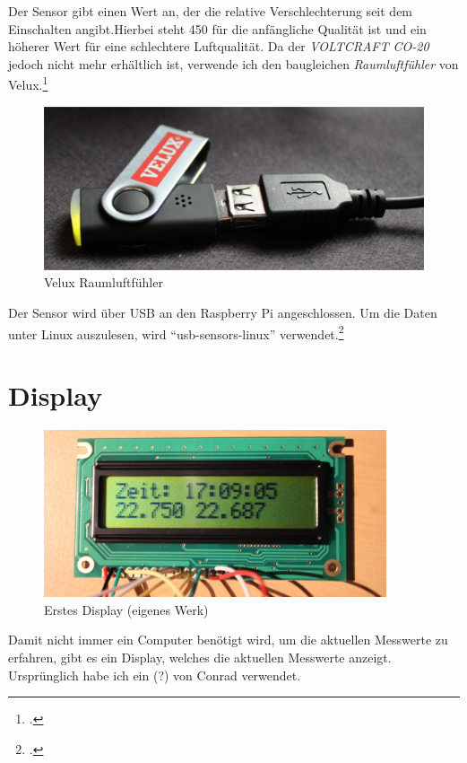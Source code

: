 Der Sensor gibt einen Wert an, der die relative Verschlechterung seit dem Einschalten angibt.Hierbei steht 450 für die anfängliche Qualität ist und ein höherer Wert für eine schlechtere Luftqualität.
Da der \textit{VOLTCRAFT CO-20} jedoch nicht mehr erhältlich ist, verwende ich den baugleichen \textit{Raumluftfühler} von Velux.\footcite{Velux}

\begin{figure}[h]
  \centering
     \includegraphics[width=\textwidth]{figures/velux.jpg}
  \caption{Velux Raumluftfühler}
  \label{fig:velux}
\end{figure}

Der Sensor wird über USB an den Raspberry Pi angeschlossen. Um die Daten unter Linux auszulesen, wird \enquote{usb-sensors-linux} verwendet.\footcite{usb-sensors-linux}

\section{Display}

\begin{figure}[h]
  \centering
     \includegraphics[width=0.9\textwidth]{figures/erstes_display.jpg}
  \caption{Erstes Display (eigenes Werk)}
  \label{fig:erstes_display}
\end{figure}

Damit nicht immer ein Computer benötigt wird, um die aktuellen Messwerte zu erfahren, gibt es ein Display, welches die aktuellen Messwerte anzeigt. Ursprünglich habe ich ein (?)
von Conrad verwendet.

